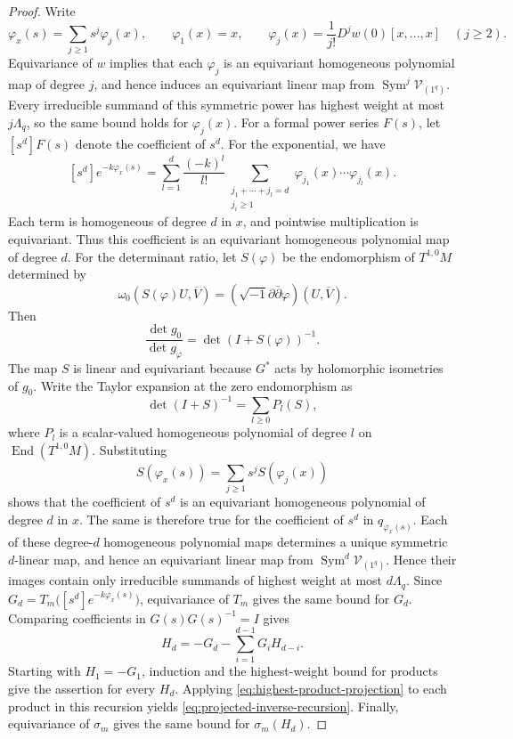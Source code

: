 \documentclass[11pt,reqno]{amsart}
\theoremstyle{corollary}
\theoremstyle{conjecture}
\theoremstyle{assumption}
\theoremstyle{proposition}
\theoremstyle{remark}
\numberwithin{equation}{section}
\newcommand{\pa}{\partial}
\newcommand{\pp}{\bar\partial}
\begin{document}
\begin{proof}
Write
\[
\varphi_x(s)=\sum_{j\geq1}s^j\varphi_j(x),\qquad \varphi_1(x)=x,\qquad \varphi_j(x)=\frac1{j!}D^jw(0)[x,\ldots,x]\quad(j\geq 2).
\]
Equivariance of $w$ implies that each $\varphi_j$ is an equivariant homogeneous polynomial map of degree $j$, and hence induces an equivariant linear map from $\operatorname{Sym}^j\mathcal V_{(1^q)}$. Every irreducible summand of this symmetric power has highest weight at most $j\Lambda_q$, so the same bound holds for $\varphi_j(x)$.
For a formal power series $F(s)$, let $[s^d]F(s)$ denote the coefficient of $s^d$. For the exponential, we have
\[
[s^d]e^{-k\varphi_x(s)}=\sum_{l=1}^{d}\frac{(-k)^l}{l!}\sum_{\substack{j_1+\cdots+j_l=d\\ j_i\geq1}}\varphi_{j_1}(x)\cdots\varphi_{j_l}(x).
\]
Each term is homogeneous of degree $d$ in $x$, and pointwise multiplication is equivariant. Thus this coefficient is an equivariant homogeneous polynomial map of degree $d$.
For the determinant ratio, let $S(\varphi)$ be the endomorphism of $T^{1,0}M$ determined by
\[
\omega_0(S(\varphi)U,\overline V)=(\sqrt{-1}\pa\pp\varphi)(U,\overline V).
\]
Then
\[
\frac{\det g_0}{\det g_\varphi}=\det(I+S(\varphi))^{-1}.
\]
The map $S$ is linear and equivariant because $G^*$ acts by holomorphic isometries of $g_0$. Write the Taylor expansion at the zero endomorphism as
\[
\det(I+S)^{-1}=\sum_{l\geq0}P_l(S),
\]
where $P_l$ is a scalar-valued homogeneous polynomial of degree $l$ on $\operatorname{End}(T^{1,0}M)$. Substituting
\[
S(\varphi_x(s))=\sum_{j\geq1}s^jS(\varphi_j(x))
\]
shows that the coefficient of $s^d$ is an equivariant homogeneous polynomial of degree $d$ in $x$. The same is therefore true for the coefficient of $s^d$ in $q_{\varphi_x(s)}$.
Each of these degree-$d$ homogeneous polynomial maps determines a unique symmetric $d$-linear map, and hence an equivariant linear map from $\operatorname{Sym}^d\mathcal V_{(1^q)}$. Hence their images contain only irreducible summands of highest weight at most $d\Lambda_q$.
Since $G_d=T_m\bigl([s^d]e^{-k\varphi_x(s)}\bigr)$, equivariance of $T_m$ gives the same bound for $G_d$. Comparing coefficients in $G(s)G(s)^{-1}=I$ gives
\[
H_d=-G_d-\sum_{i=1}^{d-1}G_iH_{d-i}.
\]
Starting with $H_1=-G_1$, induction and the highest-weight bound for products give the assertion for every $H_d$. Applying \eqref{eq:highest-product-projection} to each product in this recursion yields \eqref{eq:projected-inverse-recursion}. Finally, equivariance of $\sigma_m$ gives the same bound for $\sigma_m(H_d)$.
\end{proof}
\end{document}

